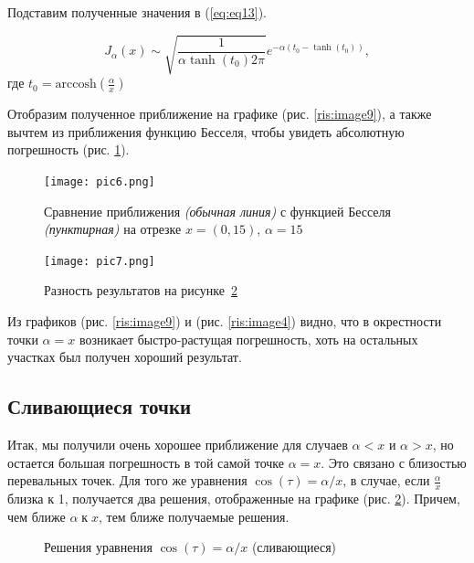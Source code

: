 \documentclass[14pt]{extarticle}
\newcommand{\arccosh}{\mathrm{arccosh}}
\begin{document}
Подставим полученные значения в (\ref{eq:eq13}).

\begin{equation}\label{eq:eq20}
J_\alpha(x) \sim \sqrt{\frac{1}{\alpha \tanh(t_0) 2 \pi}} e^{-\alpha(t_0 - \tanh(t_0))},
\end{equation}
где $t_0 = \arccosh(\frac{\alpha}{x})$

Отобразим полученное приближение на графике (рис. \ref{ris:image9}), а также вычтем из приближения функцию Бесселя, чтобы увидеть абсолютную погрешность (рис. \ref{ris:image11}).

\begin{figure}[h]
	\begin{center}
		\begin{minipage}[h]{0.45\linewidth}
			\texttt{[image: pic6.png]}
			\caption{Сравнение приближения \textit{(обычная линия)} с функцией Бесселя \textit{(пунктирная)} на отрезке $x=(0,15)$, $\alpha=15$} %
			\label{ris:image9} %
		\end{minipage}
		\hfill 
		\begin{minipage}[h]{0.45\linewidth}
			\texttt{[image: pic7.png]}
			\caption{Разность результатов на рисунке~\ref{ris:image6}}
			\label{ris:image11}
		\end{minipage}
	\end{center}
\end{figure}

Из графиков (рис. \ref{ris:image9}) и (рис. \ref{ris:image4}) видно, что в окрестности точки $\alpha=x$ возникает быстро-растущая погрешность, хоть на остальных участках был получен хороший результат.

\subsection{Сливающиеся точки}
Итак, мы получили очень хорошее приближение для случаев $\alpha<x$ и $\alpha>x$, но остается большая погрешность в той самой точке $\alpha = x$. Это связано с близостью перевальных точек.\cite{Fedoryuk} Для того же уравнения $\cos(\tau)=\alpha / x$, в случае, если $\frac{\alpha}{x}$ близка к 1, получается два решения, отображенные на графике (рис. \ref{ris:image6}). Причем, чем ближе $\alpha\;к\;x$, тем ближе получаемые решения.

\begin{figure}[h]
	\caption{Решения уравнения $\cos(\tau)=\alpha / x$ (сливающиеся)}
	\label{ris:image6}
\end{figure}
\end{document}
